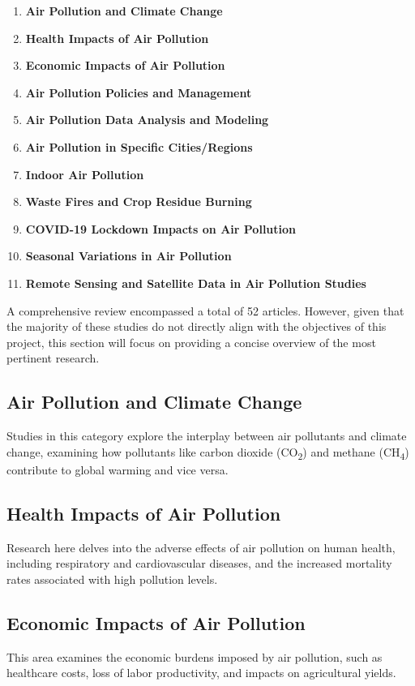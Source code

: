 \documentclass[12pt]{article}
\begin{document}
\begin{enumerate}
    \item \textbf{Air Pollution and Climate Change}
    \item \textbf{Health Impacts of Air Pollution}
    \item \textbf{Economic Impacts of Air Pollution}
    \item \textbf{Air Pollution Policies and Management}
    \item \textbf{Air Pollution Data Analysis and Modeling}
    \item \textbf{Air Pollution in Specific Cities/Regions}
    \item \textbf{Indoor Air Pollution}
    \item \textbf{Waste Fires and Crop Residue Burning}
    \item \textbf{COVID-19 Lockdown Impacts on Air Pollution}
    \item \textbf{Seasonal Variations in Air Pollution}
    \item \textbf{Remote Sensing and Satellite Data in Air Pollution Studies}
\end{enumerate}

A comprehensive review encompassed a total of 52 articles. However, given that the majority of these studies do not directly align with the objectives of this project, this section will focus on providing a concise overview of the most pertinent research.

\subsection{Air Pollution and Climate Change}
Studies in this category explore the interplay between air pollutants and climate change, examining how pollutants like carbon dioxide (CO\textsubscript{2}) and methane (CH\textsubscript{4}) contribute to global warming and vice versa.

\subsection{Health Impacts of Air Pollution}
Research here delves into the adverse effects of air pollution on human health, including respiratory and cardiovascular diseases, and the increased mortality rates associated with high pollution levels.

\subsection{Economic Impacts of Air Pollution}
This area examines the economic burdens imposed by air pollution, such as healthcare costs, loss of labor productivity, and impacts on agricultural yields.
\end{document}
